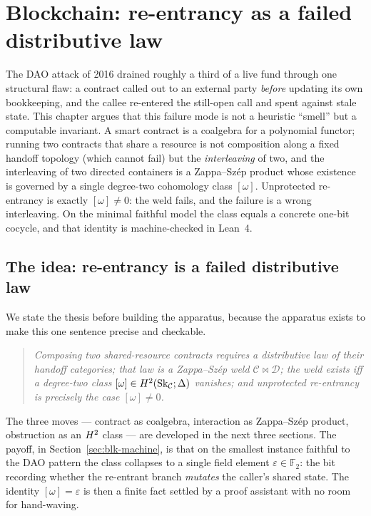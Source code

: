 \chapter{Blockchain: re-entrancy as a failed distributive law}
\label{ch:blockchain}

The DAO attack of 2016 drained roughly a third of a live fund through one structural
flaw: a contract called out to an external party \emph{before} updating its own
bookkeeping, and the callee re-entered the still-open call and spent against stale
state. This chapter argues that this failure mode is not a heuristic ``smell'' but a
computable invariant. A smart contract is a coalgebra for a polynomial functor;
running two contracts that share a resource is not composition along a fixed handoff
topology (which cannot fail) but the \emph{interleaving} of two, and the interleaving
of two directed containers is a Zappa--Sz\'ep product whose existence is governed by a
single degree-two cohomology class $[\omega]$. Unprotected re-entrancy is exactly
$[\omega]\neq 0$: the weld fails, and the failure is a wrong interleaving. On the
minimal faithful model the class equals a concrete one-bit cocycle, and that identity
is machine-checked in Lean~4.

\section{The idea: re-entrancy is a failed distributive law}

We state the thesis before building the apparatus, because the apparatus exists to make
this one sentence precise and checkable.

\begin{quotation}
\noindent\emph{Composing two shared-resource contracts requires a distributive law of
their handoff categories; that law is a Zappa--Sz\'ep weld $\mathcal{C}\bowtie\mathcal{D}$;
the weld exists iff a degree-two class $[\omega]\in H^2(\mathrm{Sk}_{\mathcal C};\Delta)$
vanishes; and unprotected re-entrancy is precisely the case $[\omega]\neq 0$.}
\end{quotation}

The three moves --- contract as coalgebra, interaction as Zappa--Sz\'ep product,
obstruction as an $H^2$ class --- are developed in the next three sections. The
payoff, in Section~\ref{sec:blk-machine}, is that on the smallest instance faithful to
the DAO pattern the class collapses to a single field element $\varepsilon\in\mathbb{F}_2$:
the bit recording whether the re-entrant branch \emph{mutates} the caller's shared
state. The identity $[\omega]=\varepsilon$ is then a finite fact settled by a proof
assistant with no room for hand-waving.

